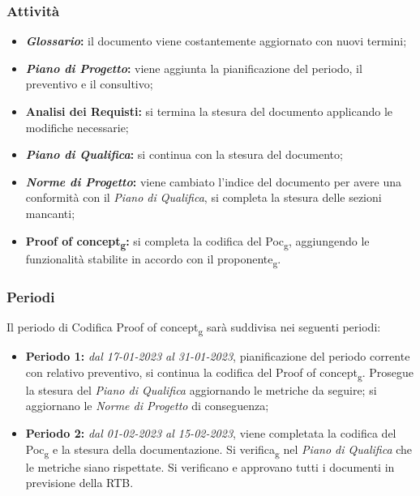 \subsubsection{Attività}
\begin{itemize}
\item \textbf{\textit{Glossario}:} il documento viene costantemente aggiornato con nuovi termini;
\item \textbf{\textit{Piano di Progetto}:} viene aggiunta la pianificazione del periodo, il preventivo e il consultivo;  
\item \textbf{Analisi dei Requisti:} si termina la stesura del documento applicando le modifiche necessarie;
\item \textbf{\textit{Piano di Qualifica}:} si continua con la stesura del documento;
\item \textbf{\textit{Norme di Progetto}:} viene cambiato l'indice del documento per avere una conformità con il \textit{Piano di Qualifica}, 
si completa la stesura delle sezioni mancanti;
\item \textbf{Proof of concept\textsubscript{g}:} si completa la codifica del Poc\textsubscript{g}, aggiungendo le funzionalità stabilite in accordo con il proponente\textsubscript{g}.
\end{itemize}

\subsubsection{Periodi}
Il periodo di Codifica Proof of concept\textsubscript{g} sarà suddivisa nei seguenti periodi:
\begin{itemize}
\item \textbf{Periodo 1:} \textit{dal 17-01-2023 al 31-01-2023}, pianificazione del periodo corrente con relativo preventivo, si continua la codifica 
del Proof of concept\textsubscript{g}. Prosegue la stesura del \textit{Piano di Qualifica} aggiornando le metriche da seguire; si aggiornano le \textit{Norme di Progetto} di conseguenza;
\item \textbf{Periodo 2:} \textit{dal 01-02-2023 al 15-02-2023},  viene completata la codifica del Poc\textsubscript{g} e la stesura della documentazione. 
Si verifica\textsubscript{g} nel \textit{Piano di Qualifica} che le metriche siano rispettate. Si verificano e approvano tutti i documenti in previsione della RTB.
\end{itemize}


